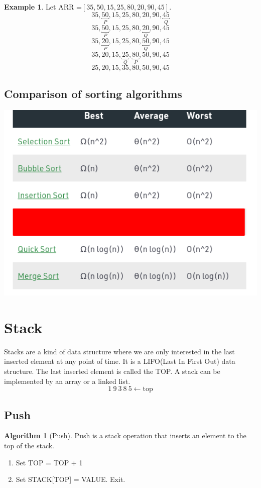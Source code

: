 \documentclass[10pt, a4paper]{extarticle}
\theoremstyle{definition}
\newtheorem{alg}{Algorithm}
\newtheorem{eg}{Example}
\begin{document}
	\begin{eg}
		Let ARR =$[35,50,15,25,80,20,90,45]$.
		\[\boxed{35},\underbracket{50}_P,15,25,80,20,90,\underbracket{45}_Q\]
		\[\boxed{35},\underbracket{50}_P,15,25,80,\underbracket{20}_Q,90,45\]
		\[\boxed{35},\underbracket{20}_P,15,25,80,\underbracket{50}_Q,90,45\]
		\[\boxed{35},20,15,\underbracket{25}_Q,\underbracket{80}_P,50,90,45\]
		\[25,20,15,\boxed{35},80,50,90,45\]
	\end{eg}

	\subsection{Comparison of sorting algorithms}
		\begin{center}
			\includegraphics[scale=0.7]{sort.png}\\
		\end{center}


	\section{Stack}
	Stacks are a kind of data structure where we are only interested in the last inserted element at any point of time. It is a LIFO(Last In First Out) data structure. The last inserted element is called the TOP. A stack can be implemented by an array or a linked list.
	\[1\ 9\ 3\ 8\ 5\leftarrow\boxed{\text{top}}\]
	\subsection{Push}
	\begin{alg}[Push]
		Push is a stack operation that inserts an element to the top of the stack.
		\begin{enumerate}
			\item Set TOP = TOP + 1
			\item Set STACK[TOP] = VALUE. Exit.
	\end{enumerate}
	\end{alg}
\end{document}
